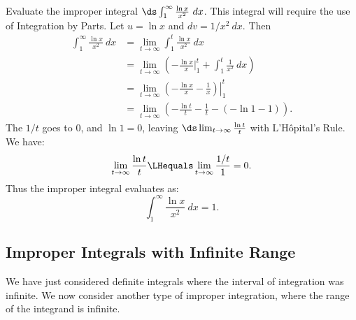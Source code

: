 \begin{example}\label{ex_impint2}
Evaluate the improper integral $\ds \int_1^\infty \frac{\ln x}{x^2}\ dx$.
\solution
This integral will require the use of Integration by Parts. Let $u = \ln x$ and $dv = 1/x^2\ dx$. Then
%
%
\begin{align*}
	\int_1^\infty\frac{\ln x}{x^2}\ dx
	&= \lim_{t\to\infty}\int_1^t\frac{\ln x}{x^2}\ dx \\
	&=  \lim_{t\to\infty}\left(-\frac{\ln x}{x}\Big|_1^t +\int_1^t \frac{1}{x^2} \ dx \right)\\
	&=  \lim_{t\to\infty} \left.\left(-\frac{\ln x}{x} -\frac1x\right)\right|_1^t\\
	&=	\lim_{t\to\infty} \left(-\frac{\ln t}{t}-\frac1t - \left(-\ln 1-1\right)\right).
\end{align*}
The $1/t$ goes to 0, and $\ln 1=0$, leaving
$\ds \lim_{t\to\infty} \frac{\ln t}{t}$ with L'Hôpital's Rule. We have:
\[\lim_{t\to\infty}\frac{\ln t}t \LHequals \lim_{t\to\infty} \frac{1/t}{1} = 0.\]
Thus the improper integral evaluates as:
\[\int_1^\infty\frac{\ln x}{x^2}\ dx = 1.\]
\end{example}

\subsection{Improper Integrals with Infinite Range}

We have just considered definite integrals where the interval of integration was infinite. We now consider another type of improper integration, where the range of the integrand is infinite.

